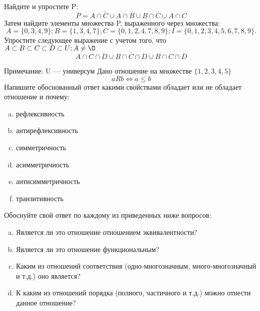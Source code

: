 \documentclass[10pt]{exam}
\begin{document}
\begin{questions}
\question
Найдите и упростите P:
\begin{equation*}
\overline{P} = A \cap \overline{C} \cup A \cap \overline{B} \cup B \cap \overline{C} \cup A \cap C
\end{equation*}
Затем найдите элементы множества P, выраженного через множества:
\begin{equation*}
A = \{0, 3, 4, 9\}; 
B = \{1, 3, 4, 7\};
C = \{0, 1, 2, 4, 7, 8, 9\};
I = \{0, 1, 2, 3, 4, 5, 6, 7, 8, 9\}.
\end{equation*}\question
Упростите следующее выражение с учетом того, что $A\subset B \subset C \subset D \subset U; A \neq \O$
\begin{equation*}
A \cap C  \cap D \cup B \cap \overline{C} \cap D \cup B \cap C \cap D
\end{equation*}

Примечание: U — универсум\question
Дано отношение на множестве $\{1, 2, 3, 4, 5\}$ 
\begin{equation*}
aRb \iff a \leq b
\end{equation*}
Напишите обоснованный ответ какими свойствами обладает или не обладает отношение и почему:   
\begin{enumerate} [a)]\setcounter{enumi}{0}
\item рефлексивность
\item антирефлексивность
\item симметричность
\item асимметричность
\item антисимметричность
\item транзитивность
\end{enumerate}

Обоснуйте свой ответ по каждому из приведенных ниже вопросов:
\begin{enumerate} [a)]\setcounter{enumi}{0}
    \item Является ли это отношение отношением эквивалентности?
    \item Является ли это отношение функциональным?
    \item Каким из отношений соответствия (одно-многозначным, много-многозначный и т.д.) оно является?
    \item К каким из отношений порядка (полного, частичного и т.д.) можно отнести данное отношение?
\end{enumerate}



\end{questions}
\end{document}
